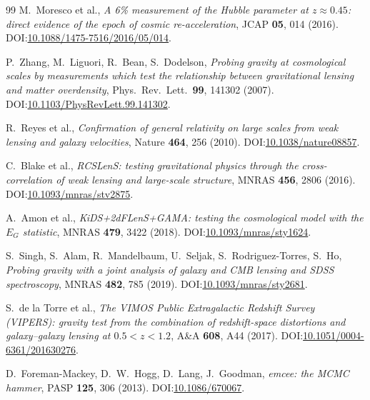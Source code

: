 \documentclass[11pt,a4paper]{article}
\begin{document}
\begin{thebibliography}{99}
 M.\ Moresco et al., \emph{A 6\% measurement of the Hubble parameter at $z \approx 0.45$: direct evidence of the epoch of cosmic re-acceleration}, JCAP \textbf{05}, 014 (2016). DOI:\href{https://doi.org/10.1088/1475-7516/2016/05/014}{10.1088/1475-7516/2016/05/014}.

 P.\ Zhang, M.\ Liguori, R.\ Bean, S.\ Dodelson, \emph{Probing gravity at cosmological scales by measurements which test the relationship between gravitational lensing and matter overdensity}, Phys.\ Rev.\ Lett.\ \textbf{99}, 141302 (2007). DOI:\href{https://doi.org/10.1103/PhysRevLett.99.141302}{10.1103/PhysRevLett.99.141302}.

 R.\ Reyes et al., \emph{Confirmation of general relativity on large scales from weak lensing and galaxy velocities}, Nature \textbf{464}, 256 (2010). DOI:\href{https://doi.org/10.1038/nature08857}{10.1038/nature08857}.

 C.\ Blake et al., \emph{RCSLenS: testing gravitational physics through the cross-correlation of weak lensing and large-scale structure}, MNRAS \textbf{456}, 2806 (2016). DOI:\href{https://doi.org/10.1093/mnras/stv2875}{10.1093/mnras/stv2875}.

 A.\ Amon et al., \emph{KiDS+2dFLenS+GAMA: testing the cosmological model with the $E_G$ statistic}, MNRAS \textbf{479}, 3422 (2018). DOI:\href{https://doi.org/10.1093/mnras/sty1624}{10.1093/mnras/sty1624}.

 S.\ Singh, S.\ Alam, R.\ Mandelbaum, U.\ Seljak, S.\ Rodriguez-Torres, S.\ Ho, \emph{Probing gravity with a joint analysis of galaxy and CMB lensing and SDSS spectroscopy}, MNRAS \textbf{482}, 785 (2019). DOI:\href{https://doi.org/10.1093/mnras/sty2681}{10.1093/mnras/sty2681}.

 S.\ de la Torre et al., \emph{The VIMOS Public Extragalactic Redshift Survey (VIPERS): gravity test from the combination of redshift-space distortions and galaxy--galaxy lensing at $0.5 < z < 1.2$}, A\&A \textbf{608}, A44 (2017). DOI:\href{https://doi.org/10.1051/0004-6361/201630276}{10.1051/0004-6361/201630276}.

 D.\ Foreman-Mackey, D.\ W.\ Hogg, D.\ Lang, J.\ Goodman, \emph{emcee: the MCMC hammer}, PASP \textbf{125}, 306 (2013). DOI:\href{https://doi.org/10.1086/670067}{10.1086/670067}.

\end{thebibliography}
\end{document}
